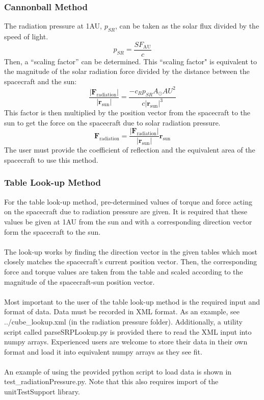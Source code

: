 \subsubsection{Cannonball Method}
The radiation pressure at 1AU, $p_{SR}$, can be taken as the solar flux divided by the speed of light. 
\begin{equation}
	p_{SR} = \frac{SF_{\mathrm{AU}}}{c}
\end{equation}
Then, a ``scaling factor'' can be determined. This ``scaling factor" is equivalent to the magnitude of the solar radiation force divided by the distance between the spacecraft and the sun:
\begin{equation}
	\frac{|\mathbf{F}_{\textrm{radiation}}|}{|\mathbf{r}_{\textrm{sun}}|} = \frac{-c_{R}p_{SR}A_{\odot}{AU}^2}{c |\mathbf{r}_{\textrm{sun}}|^3}
\end{equation}
This factor is then multiplied by the position vector from the spacecraft to the sun to get the force on the spacecraft due to solar radiation pressure.
\begin{equation}
	{\mathbf{F}_{\textrm{radiation}}} = \frac{|\mathbf{F}_{\textrm{radiation}}|}{|\mathbf{r}_{\textrm{sun}}|}  \mathbf{r}_{\textrm{sun}}
\end{equation}
The user must provide the coefficient of reflection and the equivalent area of the spacecraft to use this method.\\
\subsubsection{Table Look-up Method}
For the table look-up method, pre-determined values of torque and force acting on the spacecraft due to radiation pressure are given. It is required that these values be given at 1AU from the sun and with a corresponding direction vector form the spacecraft to the sun.\\\\
The look-up works by finding the direction vector in the given tables which most closely matches the spacecraft's current position vector. Then, the corresponding force and torque values are taken from the table and scaled according to the magnitude of the spacecraft-sun position vector.\\\\
Most important to the user of the table look-up method is the required input and format of data. Data must be recorded in XML format. As an example, see ../cube\_lookup.xml (in the radiation pressure folder). Additionally, a utility script called parseSRPLookup.py is provided there to read the XML input into numpy arrays. Experienced users are welcome to store their data in their own format and load it into equivalent numpy arrays as they see fit.\\\\
An example of using the provided python script to load data is shown in test\_radiationPressure.py. Note that this also requires import of the unitTestSupport library.\\